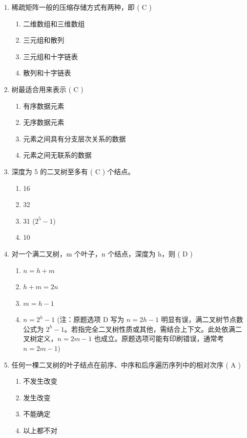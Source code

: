 \documentclass[12pt, a4paper]{article}
\begin{document}
\begin{enumerate}[label=\arabic*.]
    \item 稀疏矩阵一般的压缩存储方式有两种，即 ( C )
    \begin{enumerate}
        \item 二维数组和三维数组
        \item 三元组和散列
        \item 三元组和十字链表
        \item 散列和十字链表
    \end{enumerate}

    \item 树最适合用来表示 ( C )
    \begin{enumerate}
        \item 有序数据元素
        \item 无序数据元素
        \item 元素之间具有分支层次关系的数据
        \item 元素之间无联系的数据
    \end{enumerate}

    \item 深度为 5 的二叉树至多有 ( C ) 个结点。
    \begin{enumerate}
        \item 16
        \item 32
        \item 31 ($2^5 - 1$)
        \item 10
    \end{enumerate}

    \item 对一个满二叉树，m 个叶子，n 个结点，深度为 h，则 ( D )
    \begin{enumerate}
        \item $n=h+m$
        \item $h+m=2n$
        \item $m=h-1$
        \item $n=2^h-1$ (注：原题选项 D 写为 $n=2h-1$ 明显有误，满二叉树节点数公式为 $2^h-1$。若指完全二叉树性质或其他，需结合上下文。此处依满二叉树定义，$n = 2m-1$ 也成立。原题选项可能有印刷错误，通常考 $n=2m-1$)
    \end{enumerate}

    \item 任何一棵二叉树的叶子结点在前序、中序和后序遍历序列中的相对次序 ( A )
    \begin{enumerate}
        \item 不发生改变
        \item 发生改变
        \item 不能确定
        \item 以上都不对
    \end{enumerate}


\end{enumerate}
\end{document}
